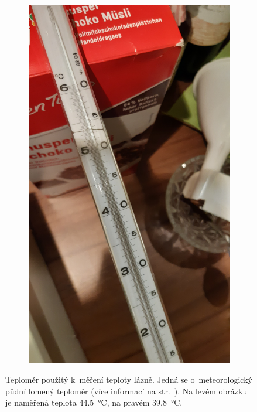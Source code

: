\documentclass[12pt]{article}
\begin{document}
\begin{figure}[h!]
\begin{subfigure}[b]{.5\textwidth}
        \includegraphics[angle = 270, width = \textwidth]{prilohy/teploměr_2.jpg}
    \end{subfigure}
    \caption{Teploměr použitý k~měření teploty lázně. Jedná se o~meteorologický půdní lomený teploměr (více informací na str.~\pageref{sec:teploměr}). Na levém obrázku je naměřená teplota \SI{44,5}{\degreeCelsius}, na pravém \SI{39,8}{\degreeCelsius}.}
    \label{fig:teploměr}
\end{figure}
\end{document}
